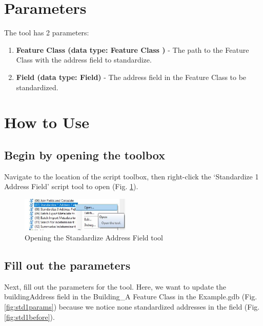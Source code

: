 \documentclass[openany]{book}
\providecommand{\tightlist}{%
  \setlength{\itemsep}{0pt}\setlength{\parskip}{0pt}}
\theoremstyle{definition}
\theoremstyle{definition}
\theoremstyle{definition}
\theoremstyle{remark}
\begin{document}
\section{Parameters}\label{parameters-7}

The tool has 2 parameters:

\begin{enumerate}
\def\labelenumi{\arabic{enumi}.}
\tightlist
\item
  \textbf{Feature Class (data type: Feature Class )} - The path to the
  Feature Class with the address field to standardize.
\item
  \textbf{Field (data type: Field)} - The address field in the Feature
  Class to be standardized.
\end{enumerate}

\section{How to Use}\label{how-to-use-7}

\subsection{Begin by opening the
toolbox}\label{begin-by-opening-the-toolbox-7}

Navigate to the location of the script toolbox, then right-click the
`Standardize 1 Address Field' script tool to open (Fig.
\ref{fig:std1open}).

\begin{figure}[H]

{\centering \includegraphics[width=2.04in,]{figures/std1-opentool} 

}

\caption{Opening the Standardize Address Field tool}\label{fig:std1open}
\end{figure}

\subsection{Fill out the parameters}\label{fill-out-the-parameters-7}

Next, fill out the parameters for the tool. Here, we want to update the
buildingAddress field in the Building\_A Feature Class in the
Example.gdb (Fig. \ref{fig:std1params}) because we notice none
standardized addresses in the field (Fig. \ref{fig:std1before}).
\end{document}
